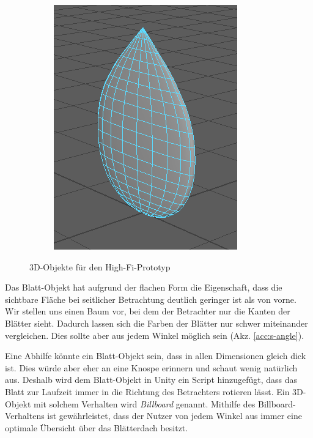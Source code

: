 \begin{figure}[htb]
\begin{subfigure}[b]{\fwidth}
  	\includegraphics[width=\textwidth]{figures/leaf}
  	 \label{fig:leaf}
  \end{subfigure}
  \caption{3D-Objekte für den High-Fi-Prototyp} \label{fig:3d-objects}
\end{figure}

Das Blatt-Objekt hat aufgrund der flachen Form die Eigenschaft, dass die sichtbare Fläche bei seitlicher Betrachtung deutlich geringer ist als von vorne. Wir stellen uns einen Baum vor, bei dem der Betrachter nur die Kanten der Blätter sieht. Dadurch lassen sich die Farben der Blätter nur schwer miteinander vergleichen. Dies sollte aber aus jedem Winkel möglich sein (Akz. \ref{acc:s-angle}).

Eine Abhilfe könnte ein Blatt-Objekt sein, dass in allen Dimensionen gleich dick ist. Dies würde aber eher an eine Knospe erinnern und schaut wenig natürlich aus. Deshalb wird dem Blatt-Objekt in Unity ein Script hinzugefügt, dass das Blatt zur Laufzeit immer in die Richtung des Betrachters rotieren lässt. Ein 3D-Objekt mit solchem Verhalten wird \textit{Billboard} genannt. Mithilfe des Billboard-Verhaltens ist gewährleistet, dass der Nutzer von jedem Winkel aus immer eine optimale Übersicht über das Blätterdach besitzt.

